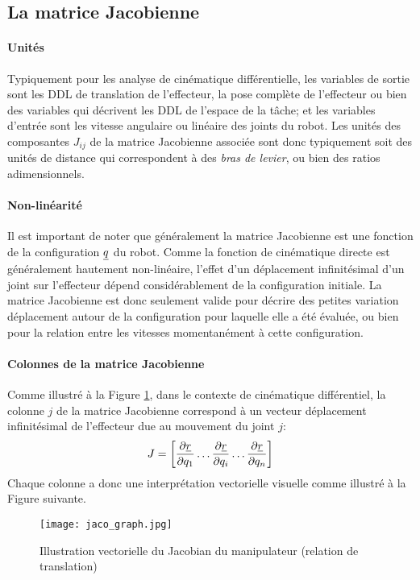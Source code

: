 \subsection{La matrice Jacobienne}

\paragraph{Unités} Typiquement pour les analyse de cinématique différentielle, les variables de sortie sont les DDL de translation de l'effecteur, la pose complète de l'effecteur ou bien des variables qui décrivent les DDL de l'espace de la tâche; et les variables d'entrée sont les vitesse angulaire ou linéaire des joints du robot. Les unités des composantes $J_{ij}$ de la matrice Jacobienne associée sont donc typiquement soit des unités de distance qui correspondent à des \textit{bras de levier}, ou bien des ratios adimensionnels. 

\paragraph{Non-linéarité} Il est important de noter que généralement la matrice Jacobienne est une fonction de la configuration $\underline{q}$ du robot. Comme la fonction de cinématique directe est généralement hautement non-linéaire, l'effet d'un déplacement infinitésimal d'un joint sur l'effecteur dépend considérablement de la configuration initiale. La matrice Jacobienne est donc seulement valide pour décrire des petites variation déplacement autour de la configuration pour laquelle elle a été évaluée, ou bien pour la relation entre les vitesses momentanément à cette configuration. 

\paragraph{Colonnes de la matrice Jacobienne} Comme illustré à la Figure \ref{fig:jaco_graph}, dans le contexte de cinématique différentiel, la colonne $j$ de la matrice Jacobienne correspond à un vecteur déplacement infinitésimal de l'effecteur due au mouvement du joint $j$:
\begin{equation}
J = \left[ \frac{\partial \underline{r}}{\partial q_1}   \hdots \frac{\partial \underline{r}}{\partial q_i} \hdots \frac{\partial \underline{r}}{\partial q_n}  \right]
\end{equation}
Chaque colonne a donc une interprétation vectorielle visuelle comme illustré à la Figure suivante.
\begin{figure}[H]
\vspace{-5pt}
	\centering
		\texttt{[image: jaco\_graph.jpg]}
	\caption{Illustration vectorielle du Jacobian du manipulateur (relation de translation)}
	\vspace{-5pt}
	\label{fig:jaco_graph}
\end{figure}




